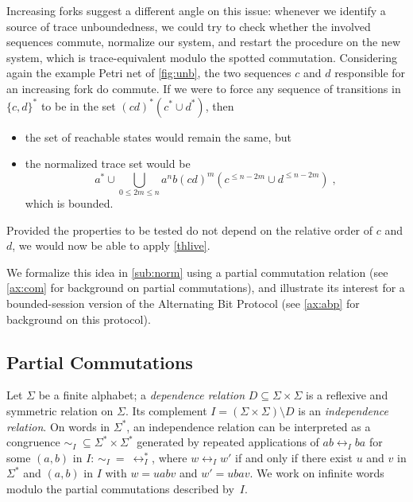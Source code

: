 \documentclass[11pt,reqno,a4paper]{amsart}
\theoremstyle{plain}
\theoremstyle{definition}
\theoremstyle{remark}
\begin{document}
Increasing forks suggest a different angle on this issue: whenever we
identify a source of trace unboundedness, we could try to check whether
the involved sequences commute, normalize our system, and restart the
procedure on the new system, which is trace-equivalent modulo the spotted
commutation.  Considering again the example Petri net of
\autoref{fig:unb}, the two sequences $c$ and $d$ responsible for an
increasing fork do commute.  If we were to force any sequence of
transitions in $\{c,d\}^\ast$ to be in the set $(cd)^\ast(c^\ast\cup
d^\ast)$, then 
\begin{itemize}
  \item the set of reachable states would remain the same, but
  \item the normalized trace set would be
    \begin{equation*}
      a^\ast\cup\bigcup_{0\leq 2m\leq n} a^nb(cd)^m(c^{\leq n-2m}\cup d^{\leq
        n-2m})\;,
    \end{equation*}
which is bounded.
\end{itemize}
Provided the properties to be tested do not depend on the relative
order of $c$ and $d$, we would now be able to apply
\autoref{thlive}.

We formalize this idea in
\autoref{sub:norm} using a partial commutation relation (see
\autoref{ax:com} for background on partial commutations), and
illustrate its interest for a bounded-session version of the
Alternating Bit Protocol (see \autoref{ax:abp} for background on this
protocol).

\newcommand{\cI}{\mathrel{\sim_{\!I}}}
\newcommand{\cIa}{\mathrel{\sim_{\!I}}}
\newcommand{\cIlim}{\mathrel{\sim_{\!I}^\mathrm{lim}}}
\newcommand{\clq}{\mathcal{C}}
\newcommand{\fnf}{\mathsf{fnf}_{\!I}}

\subsection{Partial Commutations}\label{ax:com}
Let $\Sigma$ be a finite alphabet; a \emph{dependence relation}
$D\subseteq\Sigma\times\Sigma$ is a reflexive and symmetric relation
on $\Sigma$.  Its complement $I=(\Sigma\times\Sigma)\setminus D$ is an
\emph{independence relation}.  On words in $\Sigma^\ast$, an
independence relation can be interpreted as a congruence
$\cI\;\subseteq\Sigma^\ast\times\Sigma^\ast$ generated by repeated
applications of $ab\mathrel{\leftrightarrow_I}ba$ for some $(a,b)$ in
$I$: $\cI\:=\:\leftrightarrow_I^\ast$, where
$w\mathrel{\leftrightarrow_I}w'$ if and only if there exist $u$ and
$v$ in $\Sigma^\ast$ and $(a,b)$ in $I$ with $w=uabv$ and $w'=ubav$.
We work on infinite words modulo the partial commutations described
by~$I$.
\end{document}
